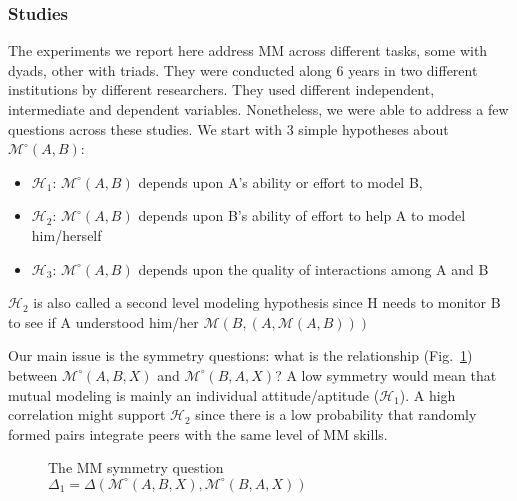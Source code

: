 \documentclass{report}
\newcommand{\Model}[3]{{$\mathcal{M}^{\circ}(#1, #2, #3)$}}
\begin{document}
\subsubsection{Studies}

The experiments we report here address MM across different tasks, some with
dyads, other with triads. They were conducted along 6 years in two different
institutions by different researchers. They used different independent,
intermediate and dependent variables. Nonetheless, we were able to address a few
questions across these studies. We start with 3 simple hypotheses about
$\mathcal{M}^{\circ}(A,B)$:

\begin{itemize}
    \item $\mathcal{H}_{1}$: $\mathcal{M}^{\circ}(A,B)$ depends upon A's ability or effort
        to model B,
    
    \item $\mathcal{H}_{2}$: $\mathcal{M}^{\circ}(A,B)$ depends upon  B's ability of
        effort to help A to model him/herself 

    \item $\mathcal{H}_{3}$: $\mathcal{M}^{\circ}(A,B)$ depends upon the quality of
        interactions among A and B

\end{itemize}



$\mathcal{H}_{2}$ is also called a second level modeling hypothesis since H
needs to monitor B to see if A understood him/her
$\mathcal{M}(B,(A,\mathcal{M}(A,B)))$

Our main issue is the symmetry questions: what is the relationship
(Fig.~\ref{mm_symmetry}) between \Model{A}{B}{X} and
\Model{B}{A}{X}? A low symmetry would mean that mutual modeling is
mainly an individual attitude/aptitude ($\mathcal{H}_{1}$). A high correlation
might support $\mathcal{H}_{2}$ since there is a low probability that randomly
formed pairs integrate peers with the same level of MM skills.

\begin{figure*}[htb]
\centering


\caption{The MM symmetry question $\Delta_1 =  \Delta(\mathcal{M}^{\circ} (A,B,X),
\mathcal{M}^{\circ} (B,A,X))$}

\label{mm_symmetry}
\end{figure*}
\end{document}
